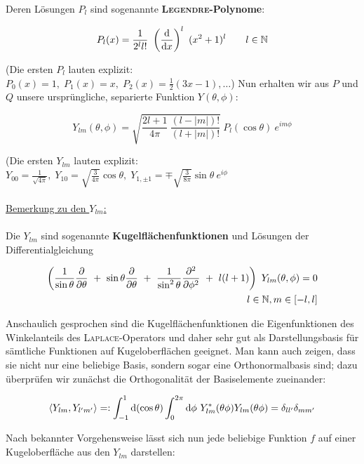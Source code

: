 Deren Lösungen $P_l$ sind sogenannte \textbf{\textsc{Legendre}-Polynome}:

\begin{equation*}
P_l(x) = \frac{1}{2^l l!} \ \left(\diff{}{x}\right)^l \ (x^2+1)^l \qquad l\in \mathbb{N}
\end{equation*}

(Die ersten $P_l$ lauten explizit: $P_0(x) =1, \; P_1(x) = x, \; P_2(x) = \frac{1}{2}(3x-1), \dotsc$)
Nun erhalten wir aus $P$ und $Q$ unsere ursprüngliche, separierte Funktion $Y(\theta,\phi)$:

\begin{equation*}
Y_{lm}(\theta,\phi) = \sqrt{\frac{2l + 1}{4\pi} \ \frac{(l-|m|)!}{(l+|m|)!}} \ P_l(\cos\theta) \ e^{im\phi}
\end{equation*}

(Die ersten $Y_{lm}$ lauten explizit: $Y_{00} = \frac{1}{\sqrt{4\pi}}, \; Y_{10} = \sqrt{\frac{3}{4\pi}}\cos\theta, \; Y_{1,\pm1} = \mp \sqrt{\frac{3}{8\pi}}\sin\theta \ e^{i\phi}$\
\\
\ \\
\underline{Bemerkung zu den $Y_{lm}$:}\\
\ \\
Die $Y_{lm}$ sind sogenannte \textbf{Kugelflächenfunktionen} und Lösungen der Differentialgleichung

\begin{align*}
\left(\frac{1}{\sin\theta}\pdiff{}{\theta} \ + \ \sin\theta \pdiff{}{\theta} \ + \ \frac{1}{\sin^2\theta} \pddiff{}{\phi} \ + \ l(l+1)\right) \ Y_{lm}(\theta,\phi) = 0\\
l \in \mathbb{N}, m \in [-l,l]
\end{align*}

Anschaulich gesprochen sind die Kugelflächenfunktionen die Eigenfunktionen des Winkelanteils des \textsc{Laplace}-Operators und daher sehr gut als Darstellungsbasis für sämtliche Funktionen auf Kugeloberflächen geeignet. Man kann auch zeigen, dass sie nicht nur eine beliebige Basis, sondern sogar eine Orthonormalbasis sind; dazu überprüfen wir zunächst die Orthogonalität der Basiselemente zueinander:

\begin{equation*}
\langle Y_{lm},Y_{l'm'}\rangle =: \int_{-1}^1\mathrm{d}(\cos\theta)\int_{0}^{2\pi}\mathrm{d}\phi \ Y^{*}_{lm}(\theta\phi) Y_{lm}(\theta\phi) = \delta_{ll'}\delta_{mm'}
\end{equation*}

Nach bekannter Vorgehensweise lässt sich nun jede beliebige Funktion $f$ auf einer Kugeloberfläche aus den $Y_{lm}$ darstellen:

